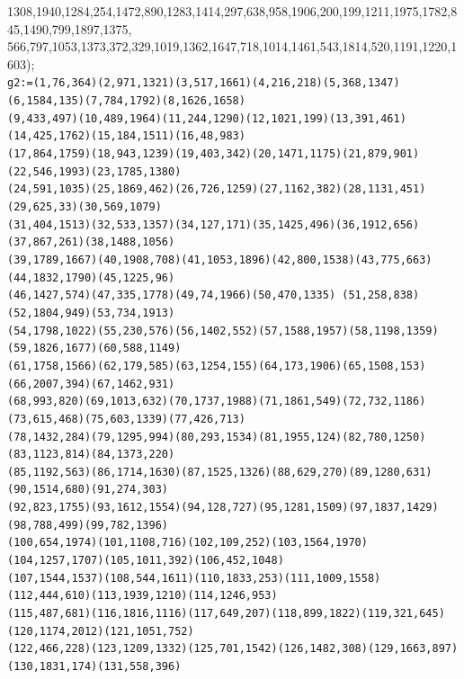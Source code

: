 \documentclass[a4paper,twopage,reqno,12pt]{amsart}
\theoremstyle{definition}
\numberwithin{equation}{section}
\begin{document}
\begin{enumerate}
{{1308,1940,1284,254,1472,890,1283,1414,297,638,958,1906,200,199,1211,1975,1782,845,1490,799,1897,1375,\\
566,797,1053,1373,372,329,1019,1362,1647,718,1014,1461,543,1814,520,1191,1220,1603);}\\
\texttt{g2:=(1,76,364)(2,971,1321)(3,517,1661)(4,216,218)(5,368,1347)(6,1584,135)(7,784,1792)(8,1626,1658)\\
(9,433,497)(10,489,1964)(11,244,1290)(12,1021,199)(13,391,461)(14,425,1762)(15,184,1511)(16,48,983)\\(17,864,1759)(18,943,1239)(19,403,342)(20,1471,1175)(21,879,901)(22,546,1993)(23,1785,1380)\\
(24,591,1035)(25,1869,462)(26,726,1259)(27,1162,382)(28,1131,451)(29,625,33)(30,569,1079)\\
(31,404,1513)(32,533,1357)(34,127,171)(35,1425,496)(36,1912,656)(37,867,261)(38,1488,1056)\\
(39,1789,1667)(40,1908,708)(41,1053,1896)(42,800,1538)(43,775,663)(44,1832,1790)(45,1225,96)\\
(46,1427,574)(47,335,1778)(49,74,1966)(50,470,1335)
(51,258,838)(52,1804,949)(53,734,1913)\\
(54,1798,1022)(55,230,576)(56,1402,552)(57,1588,1957)(58,1198,1359)(59,1826,1677)(60,588,1149)\\
(61,1758,1566)(62,179,585)(63,1254,155)(64,173,1906)(65,1508,153)(66,2007,394)(67,1462,931)\\
(68,993,820)(69,1013,632)(70,1737,1988)(71,1861,549)(72,732,1186)(73,615,468)(75,603,1339)(77,426,713)\\(78,1432,284)(79,1295,994)(80,293,1534)(81,1955,124)(82,780,1250)(83,1123,814)(84,1373,220)\\
(85,1192,563)(86,1714,1630)(87,1525,1326)(88,629,270)(89,1280,631)(90,1514,680)(91,274,303)\\
(92,823,1755)(93,1612,1554)(94,128,727)(95,1281,1509)(97,1837,1429)(98,788,499)(99,782,1396)\\
(100,654,1974)(101,1108,716)(102,109,252)(103,1564,1970)(104,1257,1707)(105,1011,392)(106,452,1048)\\
(107,1544,1537)(108,544,1611)(110,1833,253)(111,1009,1558)(112,444,610)(113,1939,1210)(114,1246,953)\\
(115,487,681)(116,1816,1116)(117,649,207)(118,899,1822)(119,321,645)(120,1174,2012)(121,1051,752)\\
(122,466,228)(123,1209,1332)(125,701,1542)(126,1482,308)(129,1663,897)(130,1831,174)(131,558,396)\\
}}
\end{enumerate}
\end{document}
